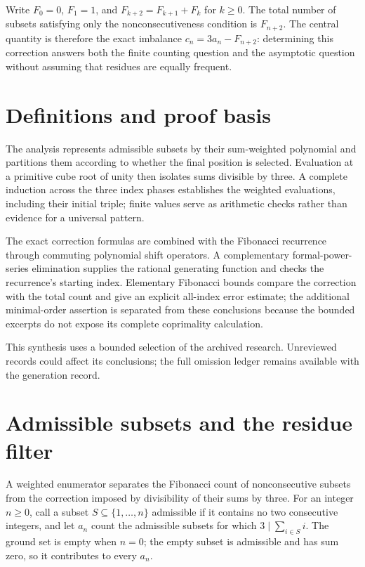 \documentclass[11pt]{article}
\begin{document}
Write $F_0=0$, $F_1=1$, and $F_{k+2}=F_{k+1}+F_k$ for $k\geq 0$. The total number of subsets satisfying only the nonconsecutiveness condition is $F_{n+2}$. The central quantity is therefore the exact imbalance $c_n=3a_n-F_{n+2}$: determining this correction answers both the finite counting question and the asymptotic question without assuming that residues are equally frequent.

\section{Definitions and proof basis}
The analysis represents admissible subsets by their sum-weighted polynomial and partitions them according to whether the final position is selected. Evaluation at a primitive cube root of unity then isolates sums divisible by three. A complete induction across the three index phases establishes the weighted evaluations, including their initial triple; finite values serve as arithmetic checks rather than evidence for a universal pattern.

The exact correction formulas are combined with the Fibonacci recurrence through commuting polynomial shift operators. A complementary formal-power-series elimination supplies the rational generating function and checks the recurrence's starting index. Elementary Fibonacci bounds compare the correction with the total count and give an explicit all-index error estimate; the additional minimal-order assertion is separated from these conclusions because the bounded excerpts do not expose its complete coprimality calculation.

This synthesis uses a bounded selection of the archived research. Unreviewed records could affect its conclusions; the full omission ledger remains available with the generation record.
\section{Admissible subsets and the residue filter}
A weighted enumerator separates the Fibonacci count of nonconsecutive subsets from the correction imposed by divisibility of their sums by three. For an integer $n\geq 0$, call a subset $S\subseteq\{1,\ldots,n\}$ admissible if it contains no two consecutive integers, and let $a_n$ count the admissible subsets for which $3\mid\sum_{i\in S}i$. The ground set is empty when $n=0$; the empty subset is admissible and has sum zero, so it contributes to every $a_n$.
\end{document}
